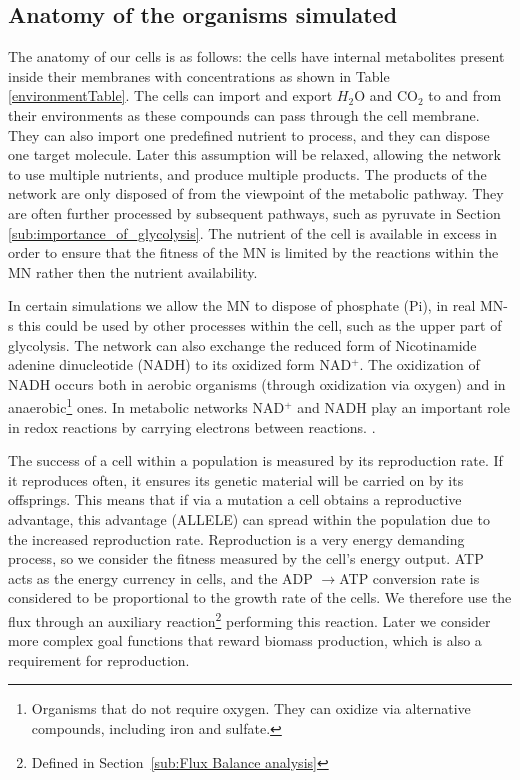 \documentclass[a4paper,12pt]{article}
\begin{document}
	\subsection{Anatomy of the organisms simulated}
	\label{ssub:anatomy_of_the_oganisms_simulated}
	
	The anatomy of our cells is as follows: the cells have internal metabolites present inside  their membranes with concentrations as shown in Table \ref{environmentTable}. The cells can import and export $H_2$O and CO$_2$ to and from their environments as these compounds can pass through the cell membrane. They can also import one predefined nutrient to process, and they can dispose one target molecule. Later this assumption will be relaxed, allowing the network to use multiple nutrients, and produce multiple products. The products of the network are only disposed of from the viewpoint of the metabolic pathway. They are often further processed by subsequent pathways, such as pyruvate in Section \ref{sub:importance_of_glycolysis}. The nutrient of the cell is available in excess in order to ensure that the fitness of the MN is limited by the reactions within the MN rather then the nutrient availability. 
	
	In certain simulations we allow the MN to dispose of phosphate (Pi), in real MN-s this could be used by other processes within the cell, such as the upper part of glycolysis. The network can also exchange the reduced form of Nicotinamide adenine dinucleotide (NADH) to its oxidized form NAD$^+$. The oxidization of NADH occurs both in aerobic organisms (through oxidization via oxygen) and in anaerobic\footnote{ Organisms that do not require oxygen. They can oxidize via alternative compounds, including iron and sulfate.} ones. In metabolic networks NAD$^+$ and NADH play an important role in redox reactions by carrying electrons between reactions. \cite{principlesofbio}.

	The success of a cell within a population is measured by its reproduction rate. If it reproduces often, it ensures its genetic material will be carried on by its offsprings. This means that if via a mutation a cell obtains a reproductive advantage, this advantage (ALLELE)  can spread within the population due to the increased reproduction rate. Reproduction is a very energy demanding process, so we consider the fitness  measured by the cell's energy output. ATP acts as the energy currency in cells, and the ADP $\rightarrow$ATP conversion rate is considered to be proportional to the growth rate of the cells. We therefore use the flux through an auxiliary reaction\footnote{Defined in Section~\ref{sub:Flux Balance analysis}} performing this reaction.  Later we consider more complex goal functions that reward biomass production, which is also a requirement for reproduction. 
\end{document}
